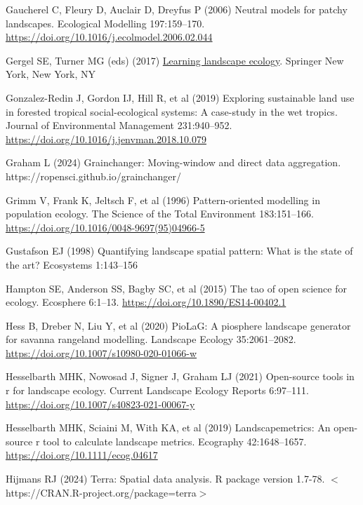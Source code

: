 \documentclass[
  10pt,
  a4paperpaper,
]{article}
\newlength{\cslhangindent}
\newenvironment{CSLReferences}[2] %
 {\begin{list}{}{%
  \setlength{\itemindent}{0pt}
  \setlength{\leftmargin}{0pt}
  \setlength{\parsep}{0pt}
  \ifodd #1
   \setlength{\leftmargin}{\cslhangindent}
   \setlength{\itemindent}{-1\cslhangindent}
  \fi
  \setlength{\itemsep}{#2\baselineskip}}}
 {\end{list}}
\begin{document}
\begin{CSLReferences}{1}{1}
Gaucherel C, Fleury D, Auclair D, Dreyfus P (2006) Neutral models for
patchy landscapes. Ecological Modelling 197:159--170.
\url{https://doi.org/10.1016/j.ecolmodel.2006.02.044}

Gergel SE, Turner MG (eds) (2017)
\href{https://doi.org/10.1007/978-1-4939-6374-4}{Learning landscape
ecology}. Springer New York, New York, NY

Gonzalez-Redin J, Gordon IJ, Hill R, et al (2019) Exploring sustainable
land use in forested tropical social-ecological systems: A case-study in
the wet tropics. Journal of Environmental Management 231:940--952.
\url{https://doi.org/10.1016/j.jenvman.2018.10.079}

Graham L (2024) Grainchanger: Moving-window and direct data aggregation.
{https://ropensci.github.io/grainchanger/}

Grimm V, Frank K, Jeltsch F, et al (1996) Pattern-oriented modelling in
population ecology. The Science of the Total Environment 183:151--166.
\url{https://doi.org/10.1016/0048-9697(95)04966-5}

Gustafson EJ (1998) Quantifying landscape spatial pattern: What is the
state of the art? Ecosystems 1:143--156

Hampton SE, Anderson SS, Bagby SC, et al (2015) The tao of open science
for ecology. Ecosphere 6:1--13.
\url{https://doi.org/10.1890/ES14-00402.1}

Hess B, Dreber N, Liu Y, et al (2020) PioLaG: A piosphere landscape
generator for savanna rangeland modelling. Landscape Ecology
35:2061--2082. \url{https://doi.org/10.1007/s10980-020-01066-w}

Hesselbarth MHK, Nowosad J, Signer J, Graham LJ (2021) Open-source tools
in r for landscape ecology. Current Landscape Ecology Reports 6:97--111.
\url{https://doi.org/10.1007/s40823-021-00067-y}

Hesselbarth MHK, Sciaini M, With KA, et al (2019) Landscapemetrics: An
open-source r tool to calculate landscape metrics. Ecography
42:1648--1657. \url{https://doi.org/10.1111/ecog.04617}

Hijmans RJ (2024) Terra: Spatial data analysis. R package version
1.7-78. {\(<\)}{https://CRAN.R-project.org/package=terra\(>\)}


\end{CSLReferences}
\end{document}

